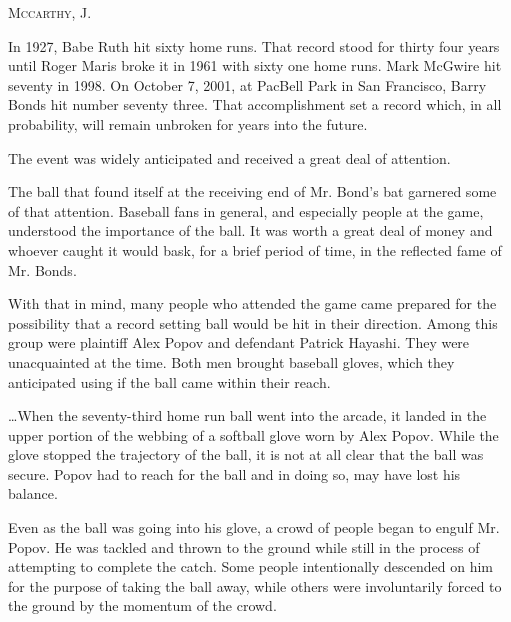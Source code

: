 

\opinion \textsc{Mccarthy}, J.


In 1927, Babe Ruth hit sixty home runs. That record stood for thirty four years
until Roger Maris broke it in 1961 with sixty one home runs. Mark McGwire hit
seventy in 1998. On October 7, 2001, at PacBell Park in San Francisco, Barry
Bonds hit number seventy three. That accomplishment set a record which, in all
probability, will remain unbroken for years into the future.

The event was widely anticipated and received a great deal of attention.

The ball that found itself at the receiving end of Mr. Bond's bat garnered some
of that attention. Baseball fans in general, and especially people at the game,
understood the importance of the ball. It was worth a great deal of
money and whoever caught it would bask, for a
brief period of time, in the reflected fame of Mr. Bonds.


With that in mind, many people who attended the game came prepared for the
possibility that a record setting ball would be hit in their direction. Among
this group were plaintiff Alex Popov and defendant Patrick Hayashi. They were
unacquainted at the time. Both men brought baseball gloves, which they
anticipated using if the ball came within their reach.

\ldots When the seventy-third home run ball went into the arcade, it landed in
the upper portion of the webbing of a softball glove worn by Alex Popov. While
the glove stopped the trajectory of the ball, it is not at all clear that the
ball was secure. Popov had to reach for the ball and in doing so, may have lost
his balance.

Even as the ball was going into his glove, a crowd of people began to engulf Mr.
Popov. He was tackled and thrown to the ground while still in the process of
attempting to complete the catch. Some people intentionally descended on him for
the purpose of taking the ball away, while others were involuntarily forced to
the ground by the momentum of the crowd.

